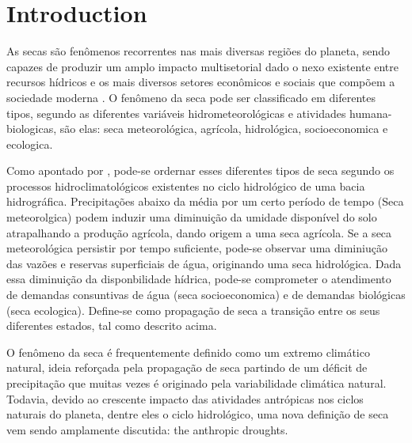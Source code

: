 \section{Introduction}
	As secas são fenômenos recorrentes nas mais diversas regiões do planeta, sendo capazes de produzir um amplo impacto multisetorial dado o nexo existente entre recursos hídricos e os mais diversos setores econômicos e sociais que compõem a sociedade moderna \citep{AghaKouchak2021,Mishra2007,Mishra2010,Wang2023,VanLoon2016,Xu2019}. O fenômeno da seca pode ser classificado em diferentes tipos, segundo as diferentes variáveis hidrometeorológicas e atividades humana-biologicas, são elas: seca meteorológica, agrícola, hidrológica, socioeconomica e ecologica.

	Como apontado por \citet{Wang2023,Xu2019}, pode-se ordernar esses diferentes tipos de seca segundo os processos hidroclimatológicos existentes no ciclo hidrológico de uma bacia hidrográfica. Precipitações abaixo da média por um certo período de tempo (Seca meteorolgica) podem induzir uma diminuição da umidade disponível do solo atrapalhando a produção agrícola, dando origem a uma seca agrícola. Se a seca meteorológica persistir por tempo suficiente, pode-se observar uma diminiução das vazões e reservas superficiais de água, originando uma seca hidrológica. Dada essa diminuição da disponbilidade hídrica, pode-se comprometer o atendimento de demandas consuntivas de água (seca socioeconomica) e de demandas biológicas (seca ecologica). Define-se como propagação de seca a transição entre os seus diferentes estados, tal como descrito acima.

	O fenômeno da seca é frequentemente definido como um extremo climático natural, ideia reforçada pela propagação de seca partindo de um déficit de precipitação que muitas vezes é originado pela variabilidade climática natural. Todavia, devido ao crescente impacto das atividades antrópicas nos ciclos naturais do planeta, dentre eles o ciclo hidrológico, uma nova definição de seca vem sendo amplamente discutida: the anthropic droughts.